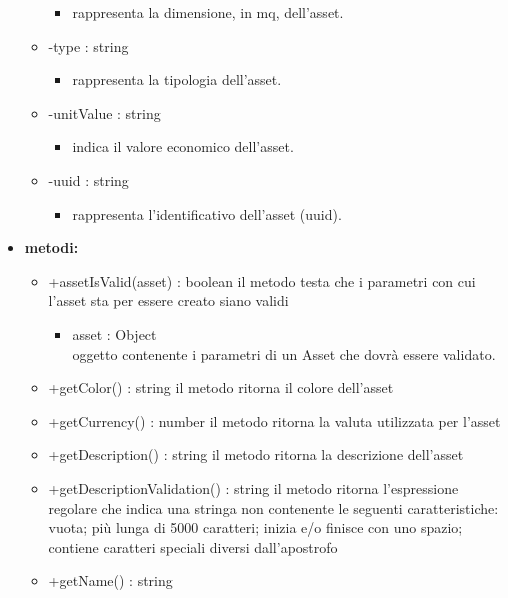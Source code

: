 \begin{itemize}
\begin{itemize}
\begin{itemize}
			\item rappresenta la dimensione, in mq, dell'asset.\end{itemize}
		\item -type : string\begin{itemize}
			\item rappresenta la tipologia dell'asset.\end{itemize}
		\item -unitValue : string\begin{itemize}
			\item indica il valore economico dell'asset.\end{itemize}
		\item -uuid : string\begin{itemize}
			\item rappresenta l'identificativo dell'asset (uuid).\end{itemize}
	\end{itemize}
	\item \textbf{metodi:}
	\begin{itemize}
		\item +assetIsValid(asset) : boolean\newline
		il metodo testa che i parametri con cui l'asset sta per essere creato siano validi
		\begin{itemize}
			\item asset : Object\\
			oggetto contenente i parametri di un Asset che dovrà essere validato.
		\end{itemize}
		\item +getColor() : string\newline
		il metodo ritorna il colore dell'asset
		\item +getCurrency() : number\newline
		il metodo ritorna la valuta utilizzata per l'asset
		\item +getDescription() : string\newline
		il metodo ritorna la descrizione dell'asset
		\item +getDescriptionValidation() : string\newline
		il metodo ritorna l'espressione regolare che indica una stringa non contenente le seguenti caratteristiche: vuota; più lunga di 5000 caratteri; inizia e/o finisce con uno spazio; contiene caratteri speciali
		diversi dall’apostrofo
		\item +getName() : string\newline

\end{itemize}
\end{itemize}
